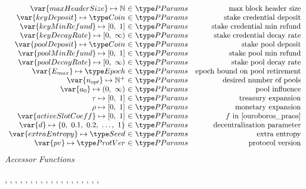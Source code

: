 \begin{figure*}[htb]
\begin{equation*}
\begin{array}{r@{~\in~}lr}
        \var{maxHeaderSize} \mapsto \N & \PParams & \text{max block header size}\\
        \var{keyDeposit} \mapsto \Coin & \PParams & \text{stake credential deposit}\\
        \var{keyMinRefund} \mapsto \unitInterval & \PParams & \text{stake credential min refund}\\
        \var{keyDecayRate} \mapsto \nonnegReals & \PParams & \text{stake credential decay rate}\\
        \var{poolDeposit} \mapsto \Coin & \PParams & \text{stake pool deposit}\\
        \var{poolMinRefund} \mapsto \unitInterval & \PParams & \text{stake pool min refund}\\
        \var{poolDecayRate} \mapsto \nonnegReals & \PParams & \text{stake pool decay rate}\\
        \var{E_{max}} \mapsto \Epoch & \PParams & \text{epoch bound on pool retirement}\\
        \var{n_{opt}} \mapsto \Npos & \PParams & \text{desired number of pools}\\
        \var{a_0} \mapsto \posReals & \PParams & \text{pool influence}\\
        \tau \mapsto \unitInterval & \PParams & \text{treasury expansion}\\
        \rho \mapsto \unitInterval & \PParams & \text{monetary expansion}\\
        \var{activeSlotCoeff} \mapsto \unitInterval & \PParams & f\text{ in \cite{ouroboros_praos}}\\
        \var{d} \mapsto \{0,~0.1,~0.2,~\ldots,~1\} & \PParams & \text{decentralization parameter}\\
        \var{extraEntropy} \mapsto \Seed & \PParams & \text{extra entropy}\\
        \var{pv} \mapsto \ProtVer & \PParams & \text{protocol version}\\
      \end{array}
  \end{equation*}
  \emph{Accessor Functions}
  \begin{center}
    ,
    ,
    ,
    ,
    ,
    ,
    ,
    ,
    ,
    ,
    ,
    ,
    ,
    ,
    ,
    ,
    ,
    ,
    ,

\end{center}
\end{figure*}

